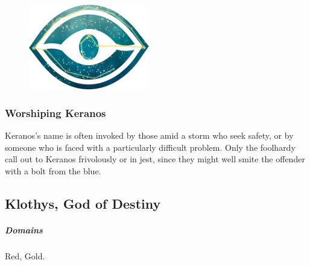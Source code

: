     \pagebreak~
    \vspace{14.0cm}


    \begin{figure}[b]
        \centering
        \includegraphics[width=0.47\textwidth]{02viphoger/img/10s_keranos.png}
    \end{figure}

    \subsubsection{Worshiping Keranos}
        Keranos's name is often invoked by those amid a storm who seek safety, or by someone who is faced with a particularly difficult problem.
        Only the foolhardy call out to Keranos frivolously or in jest, since they might well smite the offender with a bolt from the blue.

        \pagebreak

\subsection*{Klothys, God of Destiny} \label{ssec::klothys}
    \subparagraph{Domains} Red, Gold.

